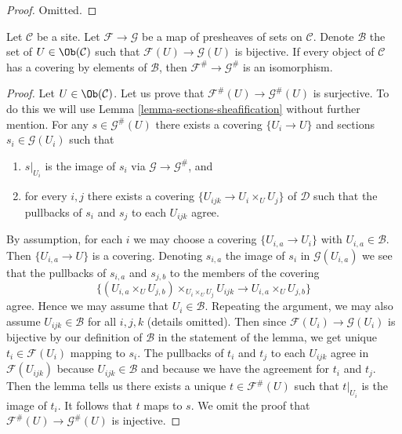 \begin{proof}
Omitted.
\end{proof}

\begin{lemma}
\label{lemma-isomorphism-sheafifications}
Let $\mathcal{C}$ be a site. Let $\mathcal{F} \to \mathcal{G}$ be a map
of presheaves of sets on $\mathcal{C}$. Denote $\mathcal{B}$ the set of
$U \in \Ob(\mathcal{C})$ such that $\mathcal{F}(U) \to \mathcal{G}(U)$
is bijective. If every object of $\mathcal{C}$ has a covering by elements
of $\mathcal{B}$, then $\mathcal{F}^\# \to \mathcal{G}^\#$ is an isomorphism.
\end{lemma}

\begin{proof}
Let $U \in \Ob(\mathcal{C})$.
Let us prove that $\mathcal{F}^\#(U) \to \mathcal{G}^\#(U)$ is
surjective. To do this we will use Lemma \ref{lemma-sections-sheafification}
without further mention. For any $s \in \mathcal{G}^\#(U)$ there exists
a covering $\{U_i \to U\}$ and sections $s_i \in \mathcal{G}(U_i)$ such that
\begin{enumerate}
\item $s|_{U_i}$ is the image of $s_i$ via $\mathcal{G} \to \mathcal{G}^\#$,
and
\item for every $i, j$ there exists a covering
$\{U_{ijk} \to U_i \times_U U_j\}$ of $\mathcal{D}$ such that
the pullbacks of $s_i$ and $s_j$ to each $U_{ijk}$ agree.
\end{enumerate}
By assumption, for each $i$ we may choose a covering $\{U_{i, a} \to U_i\}$
with $U_{i, a} \in \mathcal{B}$. Then $\{U_{i, a} \to U\}$ is a covering.
Denoting $s_{i, a}$ the image of $s_i$ in $\mathcal{G}(U_{i, a})$
we see that the pullbacks of $s_{i, a}$ and $s_{j, b}$ to the members
of the covering
$$
\{(U_{i, a} \times_U U_{j, b}) \times_{U_i \times_U U_j} U_{ijk}
\to U_{i, a} \times_U U_{j, b}\}
$$
agree. Hence we may assume that $U_i \in \mathcal{B}$. Repeating
the argument, we may also assume $U_{ijk} \in \mathcal{B}$ for
all $i, j, k$ (details omitted).
Then since $\mathcal{F}(U_i) \to \mathcal{G}(U_i)$
is bijective by our definition of $\mathcal{B}$ in the statement
of the lemma, we get unique $t_i \in \mathcal{F}(U_i)$
mapping to $s_i$. The pullbacks of $t_i$ and $t_j$
to each $U_{ijk}$ agree in $\mathcal{F}(U_{ijk})$ because
$U_{ijk} \in \mathcal{B}$ and because we have the agreement
for $t_i$ and $t_j$.
Then the lemma tells us there exists a unique
$t \in \mathcal{F}^\#(U)$ such that $t|_{U_i}$ is the image of $t_i$.
It follows that $t$ maps to $s$.
We omit the proof that $\mathcal{F}^\#(U) \to \mathcal{G}^\#(U)$
is injective.
\end{proof}









